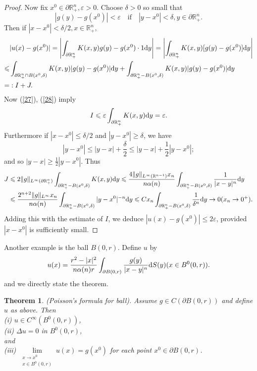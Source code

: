 \documentclass[hyperref,UTF8,12pt]{article}
\numberwithin{equation}{subsection}
\theoremstyle{plain}
\newtheorem{theorem}{Theorem}
\theoremstyle{definition}
\numberwithin{theorem}{section}
\numberwithin{lemma}{section}
\numberwithin{proposition}{section}
\numberwithin{remark}{section}
\numberwithin{corollary}{section}
\numberwithin{definition}{section}
\numberwithin{problem}{section}
\numberwithin{example}{section}
\def\dif{\textup{d}}
\newcommand{\limls}{\lim\limits}
\newcommand{\ptl}{\partial}
\newcommand{\mr}{\mathbb{R}}
\renewcommand{\leq}{\leqslant}
\renewcommand{\geq}{\geqslant}
\newcommand{\ve}{\varepsilon}
\begin{document}
\begin{proof}
Now fix $x^0\in\ptl\mr_+^n,\ve>0$. Choose $\delta>0$ so small that\[\tag{28}\label{28}
|g(y)-g(x^0)|<\ve\quad\text{if}\quad|y-x^0|<\delta,y\in\ptl\mr_+^n.\]Then if $|x-x^0|<\delta/2,x\in\mr_+^n$,\[\begin{aligned}
	&|u(x)-g(x^0)|=\left|\int_{\ptl\mr_+^n}K(x,y)g(y)-g(x^0)\cdot1\dif y\right|=\left|\int_{\ptl\mr_+^n}K(x,y)[g(y)-g(x^0)]\dif y\right|\\
	\leq&\int_{\ptl\mr_+^n\cap B(x^0,\delta)}K(x,y)|g(y)-g(x^0)|\dif y+\int_{\ptl\mr_+^n-B(x^0,\delta)}K(x,y)|g(y)-g(x^0)|\dif y\\
	=&:I+J.
\end{aligned}\]Now (\ref{27}), (\ref{28}) imply\[I\leq\ve\int_{\ptl\mr_+^n}K(x,y)\dif y=\ve.\]Furthermore if $|x-x^0|\leq\delta/2$ and $|y-x^0|\geq\delta$, we have
\[|y-x^0|\leq|y-x|+\frac{\delta}{2}\leq|y-x|+\frac{1}{2}|y-x^0|;\]
and so $|y-x|\geq\frac{1}{2}|y-x^0|$. Thus\[\begin{aligned}
	J&\leq2\|g\|_{L^\infty(\ptl\mr_+^n)}\int_{\ptl\mr_+^n-B(x^0,\delta)}K(x,y)\dif y\leq\frac{4\|g\|_{L^\infty(\mr^{n-1})}x_n}{n\alpha(n)}\int_{\ptl\mr_+^n-B(x^0,\delta)}\frac{1}{|x-y|^n}\dif y\\
	&\leq\frac{2^{n+2}\|g\|_{L^\infty}x_n}{n\alpha(n)}\int_{\ptl\mr_+^n-B(x^0,\delta)}|y-x^0|^{-n}\dif y\leq Cx_n\int_{\ptl\mr_+^n-B(x^0,\delta)}\frac{1}{\delta^n}\dif y\to0(x_n\to0^+).
\end{aligned}\]Adding this with the estimate of $I$, we deduce $|u(x)-g(x^0)|\leq2\ve$, provided $|x-x^0|$ is sufficiently small.
\end{proof}

Another example is the ball $B(0,r)$. Define $u$ by\[u(x)=\frac{r^2-|x|^2}{n\alpha(n)r}\int_
{\ptl B(0,r)}\frac{g(y)}{|x-y|^n}\dif S(y)(x\in B^0(0,r)).\] and we directly state the theorem.
\begin{theorem}\label{thm2.14.5}
(Poisson's formula for ball). Assume $g\in C(\ptl B(0,r))$ and define $u$ as above. Then\\
\textup{(i)} $u\in C^\infty(B^0(0,r))$,\\
\textup{(ii)} $\Delta u=0$ in $B^0(0,r)$,\\
and\\
\textup{(iii)} $\limls_{\substack{x\to x^0\\x\in B^0(0,r)}}u(x)=g(x^0)$ for each point $x^0\in\ptl B(0,r)$.
\end{theorem}
\end{document}

